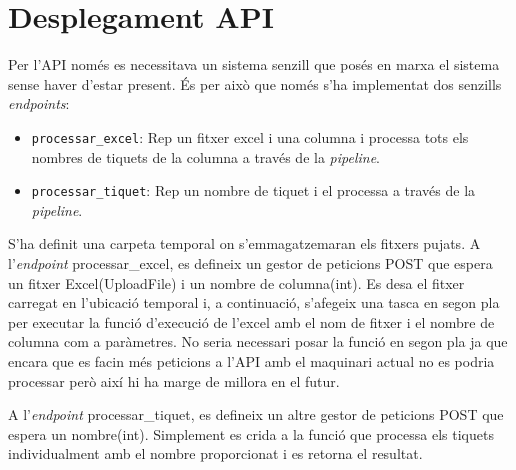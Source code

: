 \section{Desplegament API}

Per l'API només es necessitava un sistema senzill que posés en marxa el sistema sense haver d'estar present. És per això que només s'ha implementat dos senzills \textit{endpoints}:

\begin{itemize}
    \item \texttt{processar\_excel}: Rep un fitxer excel i una columna i processa tots els nombres de tiquets de la columna a través de la \textit{pipeline}.
    \item \texttt{processar\_tiquet}: Rep un nombre de tiquet i el processa a través de la \textit{pipeline}.
\end{itemize}

S'ha definit una carpeta temporal on s'emmagatzemaran els fitxers pujats. A l'\textit{endpoint} \/processar\_excel\/, es defineix un gestor de peticions POST que espera un fitxer Excel(UploadFile) i un nombre de columna(int). Es desa el fitxer carregat en l'ubicació temporal i, a continuació, s'afegeix una tasca en segon pla per executar la funció d'execució de l'excel amb el nom de fitxer i el nombre de columna com a paràmetres. No seria necessari posar la funció en segon pla ja que encara que es facin més peticions a l'API amb el maquinari actual no es podria processar però així hi ha marge de millora en el futur.

A l'\textit{endpoint} \/processar\_tiquet\/, es defineix un altre gestor de peticions POST que espera un nombre(int). Simplement es crida a la funció que processa els tiquets individualment amb el nombre proporcionat i es retorna el resultat.
